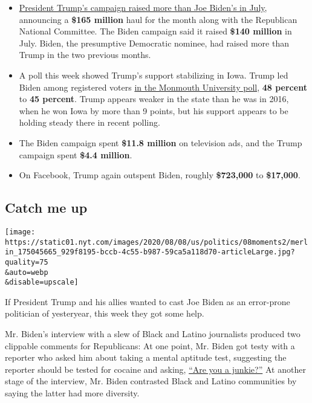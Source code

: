 \begin{itemize}
\tightlist
\item
  \href{https://www.nytimes.com/2020/08/05/us/politics/trump-biden-campaign-finance.html}{President
  Trump's campaign raised more than Joe Biden's in July}, announcing a
  \textbf{\$165 million} haul for the month along with the Republican
  National Committee. The Biden campaign said it raised \textbf{\$140
  million} in July. Biden, the presumptive Democratic nominee, had
  raised more than Trump in the two previous months.
\end{itemize}

\begin{itemize}
\item
  A poll this week showed Trump's support stabilizing in Iowa. Trump led
  Biden among registered voters
  \href{https://www.monmouth.edu/polling-institute/reports/monmouthpoll_IA_080520/}{in
  the Monmouth University poll}, \textbf{48 percent} to \textbf{45
  percent}. Trump appears weaker in the state than he was in 2016, when
  he won Iowa by more than 9 points, but his support appears to be
  holding steady there in recent polling.
\item
  The Biden campaign spent \textbf{\$11.8 million} on television ads,
  and the Trump campaign spent \textbf{\$4.4 million}.
\item
  On Facebook, Trump again outspent Biden, roughly \textbf{\$723,000} to
  \textbf{\$17,000}.
\end{itemize}

\hypertarget{catch-me-up}{%
\subsection{Catch me up}\label{catch-me-up}}

\texttt{[image: https://static01.nyt.com/images/2020/08/08/us/politics/08moments2/merlin\_175045665\_929f8195-bccb-4c55-b987-59ca5a118d70-articleLarge.jpg?quality=75\\\&auto=webp\\\&disable=upscale]}

If President Trump and his allies wanted to cast Joe Biden as an
error-prone politician of yesteryear, this week they got some help.

Mr. Biden's interview with a slew of Black and Latino journalists
produced two clippable comments for Republicans: At one point, Mr. Biden
got testy with a reporter who asked him about taking a mental aptitude
test, suggesting the reporter should be tested for cocaine and asking,
\href{https://twitter.com/errolbarnett/status/1290940305865400321?s=20}{``Are
you a junkie?''} At another stage of the interview, Mr. Biden contrasted
Black and Latino communities by saying the latter had more diversity.


